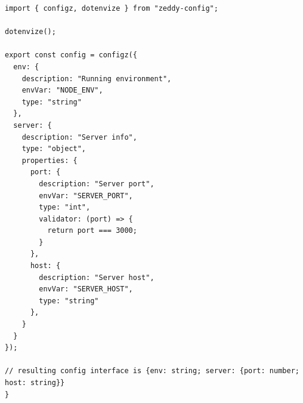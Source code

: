 \documentclass[lang=en,color=green]{elegantbook}
\begin{document}
\begin{verbatim}
import { configz, dotenvize } from "zeddy-config";

dotenvize();

export const config = configz({
  env: {
    description: "Running environment",
    envVar: "NODE_ENV",
    type: "string"
  },
  server: {
    description: "Server info",
    type: "object",
    properties: {
      port: {
        description: "Server port",
        envVar: "SERVER_PORT",
        type: "int",
        validator: (port) => {
          return port === 3000;
        }
      },
      host: {
        description: "Server host",
        envVar: "SERVER_HOST",
        type: "string"
      },
    }
  }
});

// resulting config interface is {env: string; server: {port: number; host: string}}
}
\end{verbatim}
\end{document}
